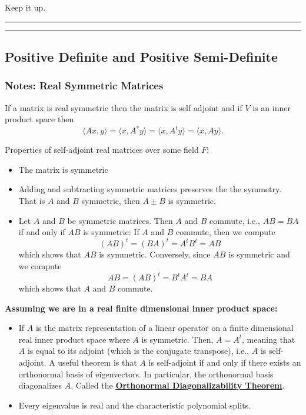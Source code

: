 \documentclass{article}
\begin{document}
Keep it up.\\

\hrule \vspace{2pt}
\hrule

\break


\subsection{Positive Definite and Positive Semi-Definite}

\subsubsection{Notes: Real Symmetric Matrices}

If a matrix is real symmetric then the matrix is self adjoint and if $V$ is an inner product space then
	\[ \langle Ax, y \rangle = \langle x, A^* y \rangle = \langle x, A^t y\rangle = \langle x, Ay \rangle. \]

Properties of self-adjoint real matrices over some field $F$:
	\begin{itemize}
		\item The matrix is symmetric
		\item Adding and subtracting symmetric matrices preserves the the symmetry. That is $A$ and $B$ symmetric,
			 then $A\pm B$ is symmetric.
		\item Let $A$ and $B$ be symmetric matrices. Then $A$ and $B$ commute, i.e., $AB = BA$ if and only if $AB$ is symmetric:
				If $A$ and $B$ commute, then we compute
					\[(AB)^t = (BA)^t = A^t B^t = AB\]
				which shows that $AB$ is symmetric. Conversely, since $AB$ is symmetric and we compute
					\[ AB = (AB)^t = B^t A^t = BA\]
				which shows that $A$ and $B$ commute.
	\end{itemize}		 
		
\textbf{Assuming we are in a real finite dimensional inner product space:}
	\begin{itemize}
		\item If $A$ is the matrix representation of a linear operator on a finite dimensional real inner product space where
		 $A$ is symmetric. Then, $A = A^t$, meaning that $A$ is equal to its adjoint (which is the conjugate transpose), i.e., 
		 $A$ is self-adjoint. A useful theorem is that $A$ is self-adjoint if and only if there exists an orthonormal basis of eigenvectors.
		 In particular, the orthonormal basis diagonalizes $A$. Called the \underline{\textbf{Orthonormal Diagonalizability Theorem}}.
		 \item Every eigenvalue is real and the characteristic polynomial splits.
	\end{itemize}
	
\end{document}

